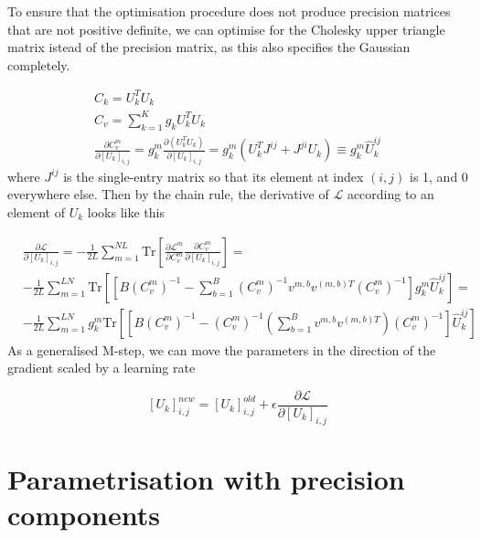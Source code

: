 \documentclass{paper}
\begin{document}
To ensure that the optimisation procedure does not produce precision matrices that are not positive definite, we can optimise for the Cholesky upper triangle matrix istead of the precision matrix, as this also specifies the Gaussian completely.

\begin{eqnarray}
C_k = U_k^T U_k \\
C_v = \sum_{k=1}^K g_k U_k^T U_k \\
\frac{\partial C_v^m}{\partial \left[ U_k \right]_{i,j}} = g_k^m \frac{\partial \left( U_k^T U_k \right)}{\partial \left[ U_k \right]_{i,j}} = g_k^m \left( U_k^T J^{ij} + J^{ji} U_k \right) \equiv g_k^m \hat U_k^{ij}
\end{eqnarray}
%
where $J^{ij}$ is the single-entry matrix so that its element at index $(i,j)$ is 1, and 0 everywhere else. Then by the chain rule, the derivative of $\mathcal{L}$ according to an element of $U_k$ looks like this

\begin{equation}
\begin{split}
&\frac{\partial \mathcal{L}}{\partial \left[ U_k \right]_{i,j}} = -\frac{1}{2L} \sum_{m=1}^{NL} \textrm{Tr} \left[ \frac{\partial \mathcal{L}^m}{\partial C_v^m} \frac{\partial C_v^m}{\partial \left[ U_k \right]_{i,j}} \right] = \\
& -\frac{1}{2L} \sum_{m=1}^{LN} \textrm{Tr} \left[  \left[ B \left( C_v^m \right)^{-1} - \sum_{b=1}^B \left( C_v^m \right)^{-1} v^{m,b} v^{(m,b)T} \left( C_v^m \right)^{-1} \right] g_k^{m} \hat U_k^{ij} \right] = \\
& -\frac{1}{2L} \sum_{m=1}^{LN} g_k^{m} \textrm{Tr} \left[ \left[ B \left( C_v^m \right)^{-1} -  \left( C_v^m \right)^{-1} \left( \sum_{b=1}^B v^{m,b} v^{(m,b)T} \right) \left( C_v^m \right)^{-1} \right] \hat U_k^{ij} \right]
\end{split}
\end{equation}
%
As a generalised M-step, we can move the parameters in the direction of the gradient scaled by a learning rate

\begin{equation}
\left[ U_k \right]_{i,j}^{new} = \left[ U_k \right]_{i,j}^{old} + \epsilon \frac{\partial \mathcal{L}}{\partial \left[ U_k \right]_{i,j}}
\end{equation}


\section{Parametrisation with precision components}
\end{document}
